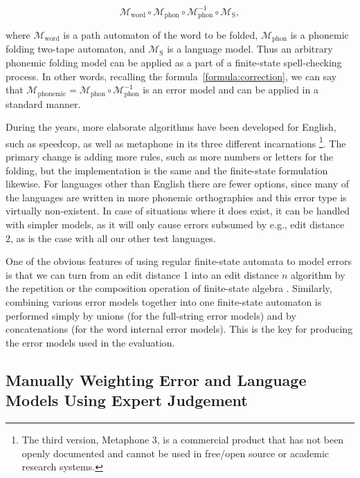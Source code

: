 \documentclass[a4paper,12pt]{article}
\begin{document}
\begin{equation}
    \mathcal{M}_{\mathrm{word}} \circ \mathcal{M}_{\mathrm{phon}} \circ \mathcal{M}_{\mathrm{phon}}^{-1} \circ \mathcal{M}_{\mathrm{S}},
\end{equation}

where $\mathcal{M}_{\mathrm{word}}$ is a path automaton of the word to be
folded, $\mathcal{M}_{\mathrm{phon}}$ is a phonemic folding two-tape automaton,
and $\mathcal{M}_{\mathrm{S}}$ is a language model. Thus an arbitrary phonemic
folding model can be applied as a part of a finite-state spell-checking
process. In other words, recalling the formula~\ref{formula:correction}, we
can say that $\mathcal{M}_{\mathrm{phonemic}} = \mathcal{M}_{\mathrm{phon}}
\circ \mathcal{M}_{\mathrm{phon}}^{-1}$ is an error model and can be applied in
a standard manner.


During the years, more elaborate algorithms have been developed for English,
such as speedcop, as well as metaphone in its three different incarnations
\cite[]{philips1990hanging,philips2000double}\footnote{The third version,
Metaphone 3, is a commercial product that has not been openly documented and
cannot be used in free/open source or academic research systems.}.  The primary
change is adding more rules, such as more numbers or letters for the folding,
but the implementation is the same and the finite-state formulation likewise.
For languages other than English there are fewer options, since many of the
languages are written in more phonemic orthographies and this error type is
virtually non-existent.  In case of situations where it does exist, it can be handled with simpler
models, as it will only cause errors subsumed by e.g., edit distance 2, as is the
case with all our other test languages.

One of the obvious features of using regular finite-state automata to model
errors is that we can turn from an edit distance 1 into an edit distance $n$
algorithm by the repetition or the composition operation of finite-state
algebra \cite[]{pirinen2012effects}. Similarly, combining various error models
together into one finite-state automaton is performed simply by unions (for the
full-string error models) and by concatenations (for the word internal error
models). This is the key for producing the error models used in the evaluation.

\subsection{Manually Weighting Error and Language Models Using Expert
Judgement}
\label{subsec:manual-weighting}
\end{document}
